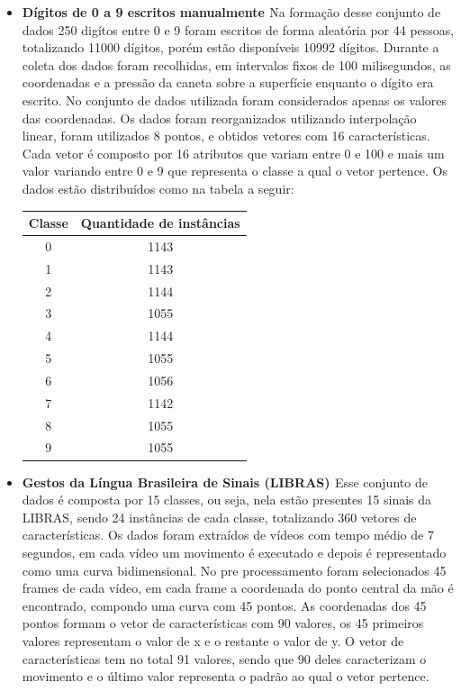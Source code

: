 \begin{itemize}
\item \textbf{Dígitos de 0 a 9 escritos manualmente \cite{Digitos}}
Na formação desse conjunto de dados 250 digítos entre 0 e 9 foram escritos de forma aleatória por 44 pessoas, totalizando 11000 dígitos, porém estão disponíveis 10992 dígitos. Durante a coleta dos dados foram recolhidas, em intervalos fixos de 100 milisegundos, as coordenadas e a pressão da caneta sobre a superfície enquanto o dígito era escrito. No conjunto de dados utilizada foram considerados apenas os valores das coordenadas. Os dados foram reorganizados utilizando interpolação linear, foram utilizados 8 pontos, e obtidos vetores com 16 características.
Cada vetor é composto por 16 atributos que variam entre 0 e 100 e mais um valor variando entre 0 e 9 que representa o classe a qual o vetor pertence.
Os dados estão distribuídos como na tabela a seguir:
\begin{center}
	\begin{tabular}{cc}
        \hline
        Classe & Quantidade de instâncias \\
        \hline
		0 & 1143 \\
		1 & 1143 \\
		2 & 1144 \\
		3 & 1055 \\
		4 & 1144 \\
		5 & 1055 \\
		6 & 1056 \\
		7 & 1142 \\
		8 & 1055 \\
		9 & 1055 \\
        \hline
	\end{tabular}
	\label{tab:tabela_digitos}
\end{center}

\item\textbf{Gestos da Língua Brasileira de Sinais (LIBRAS) \cite{Libras}}
Esse conjunto de dados é composta por 15 classes, ou seja, nela estão presentes 15 sinais da LIBRAS, sendo 24 instâncias de cada classe, totalizando 360 vetores de características. Os dados foram extraídos de vídeos com tempo médio de 7 segundos, em cada vídeo um movimento é executado e depois é representado como uma curva bidimensional. No pre processamento foram selecionados 45 frames de cada vídeo, em cada frame a coordenada do ponto central da mão é encontrado, compondo uma curva com 45 pontos. As coordenadas dos 45 pontos formam o vetor de características com 90 valores, os 45 primeiros valores representam o valor de x e o restante o valor de y.
O vetor de características tem no total 91 valores, sendo que 90 deles caracterizam o movimento e o último valor representa o padrão ao qual o vetor pertence.


\end{itemize}
